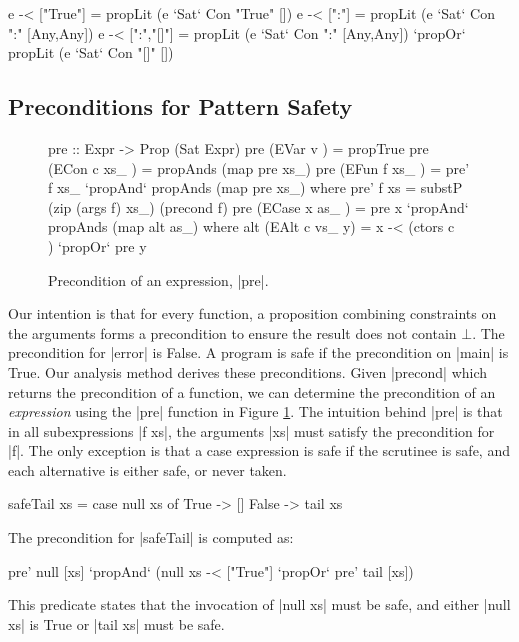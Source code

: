 \begin{code}
e -< ["True"]    =  propLit (e `Sat` Con "True" [])
e -< [":"]       =  propLit (e `Sat` Con ":" [Any,Any])
e -< [":","[]"]  =  propLit (e `Sat` Con ":" [Any,Any]) `propOr`
                    propLit (e `Sat` Con "[]" [])
\end{code}

\subsection{Preconditions for Pattern Safety}
\label{secC:precond}

\begin{figure}
\begin{code}
pre ::  Expr -> Prop (Sat Expr)
pre (EVar v       ) = propTrue
pre (ECon c xs_   ) = propAnds (map pre xs_)
pre (EFun f xs_   ) = pre' f xs_ `propAnd` propAnds (map pre xs_)
    where pre' f xs = substP (zip (args f) xs_) (precond f)
pre (ECase x as_  ) = pre x `propAnd` propAnds (map alt as_)
    where alt (EAlt c vs_ y) = x -< (ctors c \\ [c]) `propOr` pre y
\end{code}
\caption{Precondition of an expression, |pre|.}
\label{figC:precondition}
\end{figure}

Our intention is that for every function, a proposition combining constraints on the arguments forms a precondition to ensure the result does not contain $\bot{}$. The precondition for |error| is False. A program is safe if the precondition on |main| is True. Our analysis method derives these preconditions. Given |precond| which returns the precondition of a function, we can determine the precondition of an \textit{expression} using the |pre| function in Figure \ref{figC:precondition}. The intuition behind |pre| is that in all subexpressions |f xs|, the arguments |xs| must satisfy the precondition for |f|. The only exception is that a case expression is safe if the scrutinee is safe, and each alternative is either safe, or never taken.

\begin{example}
\label{exC:safeTail}
\begin{code}
safeTail xs = case  null xs of
                    True   -> []
                    False  -> tail xs
\end{code}

\noindent The precondition for |safeTail| is computed as:

\ignore\begin{code}
pre' null [xs] `propAnd` (null xs -< ["True"] `propOr` pre' tail [xs])
\end{code}

This predicate states that the invocation of |null xs| must be safe, and either |null xs| is True or |tail xs| must be safe.
\end{example}


